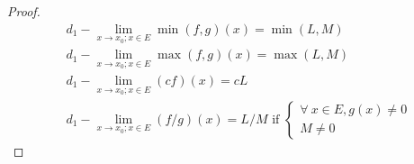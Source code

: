 \begin{proof}
\begin{align*}
         & d_1 - \lim_{x \to x_0 ; x \in E} \min(f, g)(x) = \min(L, M)                                \\
         & d_1 - \lim_{x \to x_0 ; x \in E} \max(f, g)(x) = \max(L, M)                                \\
         & d_1 - \lim_{x \to x_0 ; x \in E} (cf)(x) = cL                                              \\
         & d_1 - \lim_{x \to x_0 ; x \in E} (f / g)(x) = L / M \text{ if } \begin{cases}
            \forall\ x \in E, g(x) \neq 0 \\
            M \neq 0
        \end{cases}
    \end{align*}
\end{proof}